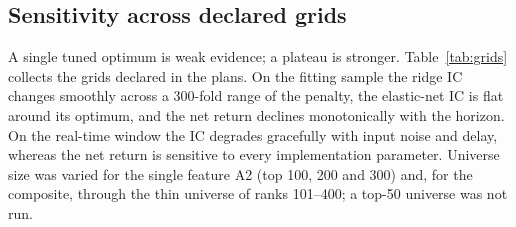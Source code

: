 \subsection{Sensitivity across declared grids}\label{sec:grids}

A single tuned optimum is weak evidence; a plateau is stronger. Table~\ref{tab:grids} collects the grids declared in the plans. On the fitting sample the ridge IC changes smoothly across a 300-fold range of the penalty, the elastic-net IC is flat around its optimum, and the net return declines monotonically with the horizon. On the real-time window the IC degrades gracefully with input noise and delay, whereas the net return is sensitive to every implementation parameter. Universe size was varied for the single feature A2 (top 100, 200 and 300) and, for the composite, through the thin universe of ranks 101--400; a top-50 universe was not run.

